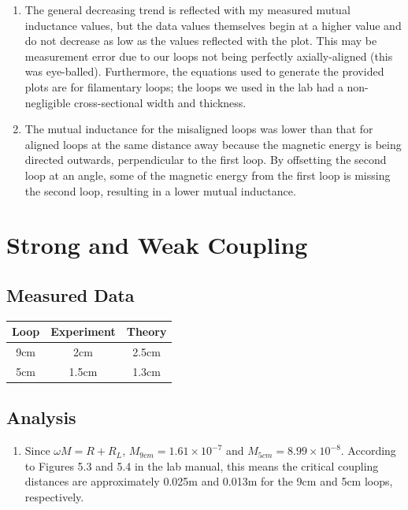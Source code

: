 \documentclass{article}
\begin{document}
\begin{enumerate}
	\item The general decreasing trend is reflected with my measured mutual inductance values, but the data values themselves begin at a higher value and do not decrease as low as the values reflected with the plot. This may be measurement error due to our loops not being perfectly axially-aligned (this was eye-balled). Furthermore, the equations used to generate the provided plots are for filamentary loops; the loops we used in the lab had a non-negligible cross-sectional width and thickness.

	\item The mutual inductance for the misaligned loops was lower than that for aligned loops at the same distance away because the magnetic energy is being directed outwards, perpendicular to the first loop. By offsetting the second loop at an angle, some of the magnetic energy from the first loop is missing the second loop, resulting in a lower mutual inductance.
\end{enumerate}


\section{Strong and Weak Coupling}

\subsection{Measured Data}
\begin{table}[H]
\centering
\begin{tabular}{|c|c|c|}
\hline
Loop & Experiment & Theory \\ \hline
9cm & 2cm & 2.5cm\\ \hline
5cm & 1.5cm & 1.3cm\\ \hline
\end{tabular}
\end{table}

\subsection{Analysis}

\begin{enumerate}
	\item Since $\omega M = R + R_L$, $M_{9cm} = 1.61\times10^{-7}$ and $M_{5cm} = 8.99\times10^{-8}$. According to Figures 5.3 and 5.4 in the lab manual, this means the critical coupling distances are approximately 0.025m and 0.013m for the 9cm and 5cm loops, respectively.
\end{enumerate}
\end{document}
